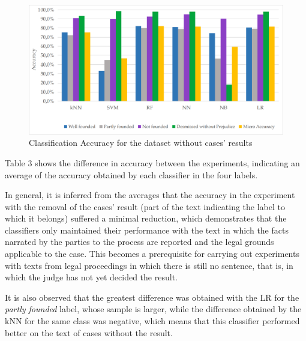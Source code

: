 \begin{figure}[htb]
    \centering
    \caption{Classification Accuracy for the dataset without cases' results}
    \label{fig:cap4_class_without_result}
    \includegraphics[width=\textwidth]{images/chapters/cap4_classification_without_result.png}
    
\end{figure}


Table 3 shows the difference in accuracy between the experiments, indicating an average of the accuracy obtained by each classifier in the four labels. 


In general, it is inferred from the averages that the accuracy in the experiment with the removal of the cases' result (part of the text indicating the label to which it belongs) suffered a minimal reduction, which demonstrates that the classifiers only maintained their performance with the text in which the facts narrated by the parties to the process are reported and the legal grounds applicable to the case. This becomes a prerequisite for carrying out experiments with texts from legal proceedings in which there is still no sentence, that is, in which the judge has not yet decided the result. 

It is also observed that the greatest difference was obtained with the LR for the \textit{partly founded} label, whose sample is larger, while the difference obtained by the kNN for the same class was negative, which means that this classifier performed better on the text of cases without the result. 



